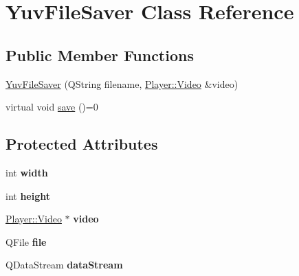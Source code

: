 \hypertarget{classPlayer_1_1YuvFileSaver}{}\section{Yuv\+File\+Saver Class Reference}
\label{classPlayer_1_1YuvFileSaver}
\subsection*{Public Member Functions}
\begin{DoxyCompactItemize}
\item 
\hyperlink{classPlayer_1_1YuvFileSaver_a8b719cb5c2ed4a777c175aef3186354b}{Yuv\+File\+Saver} (Q\+String filename, \hyperlink{classPlayer_1_1Video}{Player\+::\+Video} \&video)
\item 
virtual void \hyperlink{classPlayer_1_1YuvFileSaver_a710cb29afe2cd3d97a312f61140af200}{save} ()=0
\end{DoxyCompactItemize}
\subsection*{Protected Attributes}
\begin{DoxyCompactItemize}
\item 
\hypertarget{classPlayer_1_1YuvFileSaver_a2474a5474cbff19523a51eb1de01cda4}{}int {\bfseries width}\label{classPlayer_1_1YuvFileSaver_a2474a5474cbff19523a51eb1de01cda4}

\item 
\hypertarget{classPlayer_1_1YuvFileSaver_ad12fc34ce789bce6c8a05d8a17138534}{}int {\bfseries height}\label{classPlayer_1_1YuvFileSaver_ad12fc34ce789bce6c8a05d8a17138534}

\item 
\hypertarget{classPlayer_1_1YuvFileSaver_a07dbb9a418e118ba9322b9bee893b3d4}{}\hyperlink{classPlayer_1_1Video}{Player\+::\+Video} $\ast$ {\bfseries video}\label{classPlayer_1_1YuvFileSaver_a07dbb9a418e118ba9322b9bee893b3d4}

\item 
\hypertarget{classPlayer_1_1YuvFileSaver_a74a949f8555712ca2e528cf69d0d7f68}{}Q\+File {\bfseries file}\label{classPlayer_1_1YuvFileSaver_a74a949f8555712ca2e528cf69d0d7f68}

\item 
\hypertarget{classPlayer_1_1YuvFileSaver_a76868f3c583ad31447f724a6dcce0a8a}{}Q\+Data\+Stream {\bfseries data\+Stream}\label{classPlayer_1_1YuvFileSaver_a76868f3c583ad31447f724a6dcce0a8a}

\end{DoxyCompactItemize}


